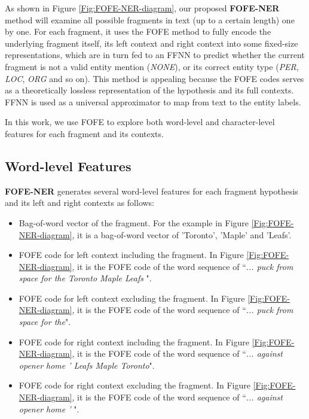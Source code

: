 \documentclass[11pt,a4paper]{article}
\begin{document}
As shown in Figure \ref{Fig:FOFE-NER-diagram}, our proposed \textbf{FOFE-NER} method will examine all possible fragments in text (up to a certain length) one by one. For each fragment, it uses the FOFE method to fully encode the underlying fragment itself, its left context and right context into some fixed-size representations, which are in turn fed to an FFNN to predict whether the current fragment is not a valid entity mention ({\it NONE}), or its correct entity type ({\it PER}, {\it LOC}, {\it ORG} and so on). This method is appealing because the FOFE codes serves as a theoretically lossless representation of the hypothesis and its full contexts. FFNN is used as a universal approximator to map from text to the entity labels. 


In this work, we use FOFE to explore both word-level and character-level features for each fragment and its contexts. 

\subsection{Word-level Features}

\textbf{FOFE-NER} generates several word-level features for each fragment hypothesis and its left and right contexts as follows:

\begin{itemize}
	\item Bag-of-word vector of the fragment.  For the example in Figure \ref{Fig:FOFE-NER-diagram}, it is a bag-of-word vector of 'Toronto', 'Maple' and 'Leafs'. 
	\item FOFE code for left context including the fragment. In Figure \ref{Fig:FOFE-NER-diagram}, it is the FOFE code of the word sequence of ``{\it ... puck from space for the Toronto Maple Leafs  }".
	\item FOFE code for left context excluding the fragment. In Figure \ref{Fig:FOFE-NER-diagram}, it is the FOFE code of the word sequence of ``{\it ... puck from space for the}".	
	\item FOFE code for right context including the fragment. In Figure \ref{Fig:FOFE-NER-diagram}, it is the FOFE code of the word sequence of ``{\it   ... against opener home ' Leafs  Maple  Toronto}".
	\item FOFE code for right context excluding the fragment. In Figure \ref{Fig:FOFE-NER-diagram}, it is the FOFE code of the word sequence of ``{\it ... against opener home ' }".
\end{itemize}
\end{document}
